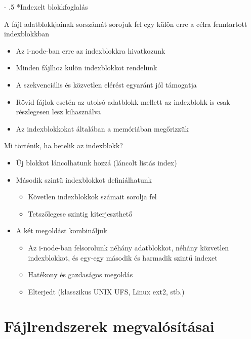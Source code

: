 \documentclass[tikz,12pt,margin=0px]{article}
\makeatletter
\renewcommand\paragraph{%
	\@startsection{paragraph}{4}{0mm}%
	{-\baselineskip}%
	{.5\baselineskip}%
	{\normalfont\normalsize\bfseries}}
\makeatother
\begin{document}
    \paragraph*{Indexelt blokkfoglalás}

    A fájl adatblokkjainak sorszámát sorojuk fel egy külön erre a célra fenntartott indexblokkban
    \begin{itemize}[topsep=8pt,itemsep=4pt,partopsep=4pt, parsep=4pt]
      \item Az i-node-ban erre az indexblokkra hivatkozunk
      \item Minden fájlhoz külön indexblokkot rendelünk
      \item A szekvenciális és közvetlen elérést egyaránt jól támogatja
      \item Rövid fájlok esetén az utolsó adatblokk mellett az indexblokk is csak részlegesen lesz kihasználva
      \item Az indexblokkokat általában a memóriában megőrizzük
    \end{itemize}

    \noindent Mi történik, ha betelik az indexblokk?
    \begin{itemize}[topsep=8pt,itemsep=4pt,partopsep=4pt, parsep=4pt]
      \item Új blokkot láncolhatunk hozzá (láncolt listás index)
      \item Második szintű indexblokkot definiálhatunk
      \begin{itemize}
        \item Követlen indexblokkok számait sorolja fel
        \item Tetszőlegese szintig kiterjeszthető
      \end{itemize}
      \item A két megoldást kombináljuk
      \begin{itemize}
        \item Az i-node-ban felsorolunk néhány adatblokkot, néhány közvetlen indexblokkot, és egy-egy második és harmadik szintű indexet
        \item Hatékony és gazdaságos megoldás
        \item Elterjedt (klasszikus UNIX UFS, Linux ext2, stb.)
      \end{itemize}
    \end{itemize}

     \section*{Fájlrendszerek megvalósításai}
\end{document}
